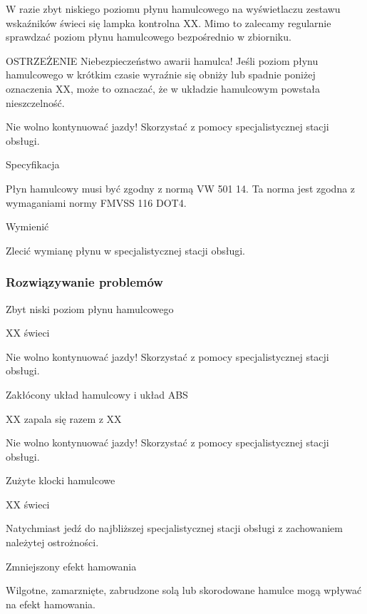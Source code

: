 W razie zbyt niskiego poziomu płynu hamulcowego na wyświetlaczu zestawu wskaźników świeci się lampka kontrolna XX.
Mimo to zalecamy regularnie sprawdzać poziom płynu hamulcowego bezpośrednio w zbiorniku.

OSTRZEŻENIE
Niebezpieczeństwo awarii hamulca!
Jeśli poziom płynu hamulcowego w krótkim czasie wyraźnie się obniży lub spadnie poniżej oznaczenia XX, może to oznaczać, że w układzie hamulcowym
powstała nieszczelność.
\begin{itemizeTriangle}
	\itemTriangle Nie wolno kontynuować jazdy! Skorzystać z pomocy specjalistycznej stacji obsługi.
\end{itemizeTriangle}

Specyfikacja

Płyn hamulcowy musi być zgodny z normą VW 501 14. Ta norma jest zgodna z wymaganiami normy FMVSS 116 DOT4.

Wymienić

Zlecić wymianę płynu w specjalistycznej stacji obsługi.

\subsubsection{Rozwiązywanie problemów}

Zbyt niski poziom płynu hamulcowego

XX świeci

\begin{itemizeArrow}
	\itemArrow Nie wolno kontynuować jazdy! Skorzystać z pomocy specjalistycznej stacji obsługi.
\end{itemizeArrow}

Zakłócony układ hamulcowy i układ ABS

XX zapala się razem z XX

\begin{itemizeArrow}
	\itemArrow Nie wolno kontynuować jazdy! Skorzystać z pomocy specjalistycznej stacji obsługi.
\end{itemizeArrow}

Zużyte klocki hamulcowe

XX świeci
\begin{itemizeArrow}
	\itemArrow Natychmiast jedź do najbliższej specjalistycznej stacji obsługi z zachowaniem należytej ostrożności.
\end{itemizeArrow}

Zmniejszony efekt hamowania

Wilgotne, zamarznięte, zabrudzone solą lub skorodowane hamulce mogą wpływać na efekt hamowania.

